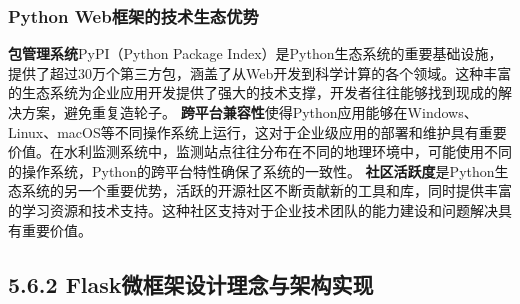 {{{{{{{{{{{{{{\begin{lstlisting}[language=Python]
\end{lstlisting} \subsubsection{Python
Web框架的技术生态优势}\label{python-webux6846ux67b6ux7684ux6280ux672fux751fux6001ux4f18ux52bf} \textbf{包管理系统}PyPI（Python Package
Index）是Python生态系统的重要基础设施，提供了超过30万个第三方包，涵盖了从Web开发到科学计算的各个领域。这种丰富的生态系统为企业应用开发提供了强大的技术支撑，开发者往往能够找到现成的解决方案，避免重复造轮子。
\textbf{跨平台兼容性}使得Python应用能够在Windows、Linux、macOS等不同操作系统上运行，这对于企业级应用的部署和维护具有重要价值。在水利监测系统中，监测站点往往分布在不同的地理环境中，可能使用不同的操作系统，Python的跨平台特性确保了系统的一致性。
\textbf{社区活跃度}是Python生态系统的另一个重要优势，活跃的开源社区不断贡献新的工具和库，同时提供丰富的学习资源和技术支持。这种社区支持对于企业技术团队的能力建设和问题解决具有重要价值。 \subsection{5.6.2
Flask微框架设计理念与架构实现}\label{flaskux5faeux6846ux67b6ux8bbeux8ba1ux7406ux5ff5ux4e0eux67b6ux6784ux5b9eux73b0}
}}}}}}}}}}}}}}
